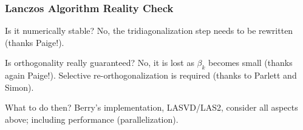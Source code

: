 \begin{frame}[plain]
	\frametitle{Lanczos Algorithm Reality Check}
	\begin{block}{Is it numerically stable?}
    No, the tridiagonalization step needs to be rewritten (thanks Paige!).
	\end{block}   
	\begin{block}{Is orthogonality really guaranteed?}
    No, it is lost as $\beta_k$ becomes small (thanks again
    Paige!). Selective re-orthogonalization is required 
    (thanks to Parlett and Simon).
	\end{block}
	\begin{block}{What to do then?}
    Berry's implementation, LASVD/LAS2, consider all aspects above;
    including performance (parallelization). 
	\end{block}
\end{frame}
